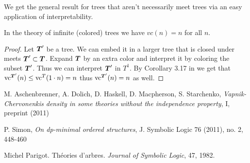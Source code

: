 \documentclass{amsart}
\DeclareMathOperator{\TT}{\boldface T}
\begin{document}
	We get the general result for trees that aren't necessarily meet trees via an easy application of interpretability.
	\begin{Corollary}
		In the theory of infinite (colored) trees we have $vc(n) = n$ for all $n$.
	\end{Corollary}
	\begin{proof}
		Let $\TT'$ be a tree. We can embed it in a larger tree that is closed under meets $\TT' \subset \TT$. Expand $\TT$ by an extra color and interpret it by coloring the subset $\TT'$. Thus we can interpret $\TT'$ in $T^1$. By Corollary 3.17 in \cite{vc_density} we get that $\vc^{\TT'}(n) \leq \vc^T(1 \cdot n) = n$ thus $\vc^{\TT'}(n) = n$ as well.
	\end{proof}
	
	\begin{thebibliography}{9}

	M. Aschenbrenner, A. Dolich, D. Haskell, D. Macpherson, S. Starchenko,
	\textit{Vapnik-Chervonenkis density in some theories without the independence property}, I, preprint (2011)

	P. Simon,
	\textit{On dp-minimal ordered structures},
	J. Symbolic Logic 76 (2011), no. 2, 448-460

	Michel Parigot.
	Th\'eories d'arbres.
	\textit{Journal of Symbolic Logic}, 47, 1982.
	
	
\end{thebibliography}
\end{document}

